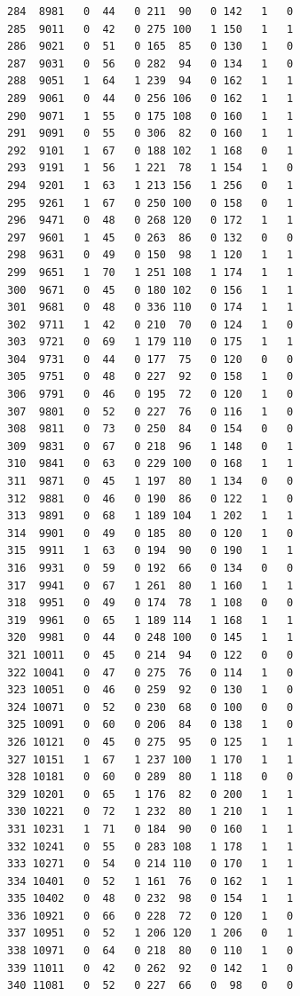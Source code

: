 \documentclass[
  letterpaper,
  DIV=11,
  numbers=noendperiod]{scrreprt}
\begin{document}
\begin{verbatim}
284  8981   0  44   0 211  90   0 142   1   0
285  9011   0  42   0 275 100   1 150   1   1
286  9021   0  51   0 165  85   0 130   1   0
287  9031   0  56   0 282  94   0 134   1   0
288  9051   1  64   1 239  94   0 162   1   1
289  9061   0  44   0 256 106   0 162   1   1
290  9071   1  55   0 175 108   0 160   1   1
291  9091   0  55   0 306  82   0 160   1   1
292  9101   1  67   0 188 102   1 168   0   1
293  9191   1  56   1 221  78   1 154   1   0
294  9201   1  63   1 213 156   1 256   0   1
295  9261   1  67   0 250 100   0 158   0   1
296  9471   0  48   0 268 120   0 172   1   1
297  9601   1  45   0 263  86   0 132   0   0
298  9631   0  49   0 150  98   1 120   1   1
299  9651   1  70   1 251 108   1 174   1   1
300  9671   0  45   0 180 102   0 156   1   1
301  9681   0  48   0 336 110   0 174   1   1
302  9711   1  42   0 210  70   0 124   1   0
303  9721   0  69   1 179 110   0 175   1   1
304  9731   0  44   0 177  75   0 120   0   0
305  9751   0  48   0 227  92   0 158   1   0
306  9791   0  46   0 195  72   0 120   1   0
307  9801   0  52   0 227  76   0 116   1   0
308  9811   0  73   0 250  84   0 154   0   0
309  9831   0  67   0 218  96   1 148   0   1
310  9841   0  63   0 229 100   0 168   1   1
311  9871   0  45   1 197  80   1 134   0   0
312  9881   0  46   0 190  86   0 122   1   0
313  9891   0  68   1 189 104   1 202   1   1
314  9901   0  49   0 185  80   0 120   1   0
315  9911   1  63   0 194  90   0 190   1   1
316  9931   0  59   0 192  66   0 134   0   0
317  9941   0  67   1 261  80   1 160   1   1
318  9951   0  49   0 174  78   1 108   0   0
319  9961   0  65   1 189 114   1 168   1   1
320  9981   0  44   0 248 100   0 145   1   1
321 10011   0  45   0 214  94   0 122   0   0
322 10041   0  47   0 275  76   0 114   1   0
323 10051   0  46   0 259  92   0 130   1   0
324 10071   0  52   0 230  68   0 100   0   0
325 10091   0  60   0 206  84   0 138   1   0
326 10121   0  45   0 275  95   0 125   1   1
327 10151   1  67   1 237 100   1 170   1   1
328 10181   0  60   0 289  80   1 118   0   0
329 10201   0  65   1 176  82   0 200   1   1
330 10221   0  72   1 232  80   1 210   1   1
331 10231   1  71   0 184  90   0 160   1   1
332 10241   0  55   0 283 108   1 178   1   1
333 10271   0  54   0 214 110   0 170   1   1
334 10401   0  52   1 161  76   0 162   1   1
335 10402   0  48   0 232  98   0 154   1   1
336 10921   0  66   0 228  72   0 120   1   0
337 10951   0  52   1 206 120   1 206   0   1
338 10971   0  64   0 218  80   0 110   1   0
339 11011   0  42   0 262  92   0 142   1   0
340 11081   0  52   0 227  66   0  98   0   0

\end{verbatim}
\end{document}
